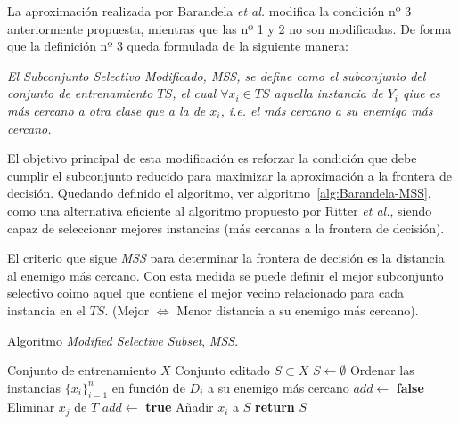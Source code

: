 La aproximación realizada por Barandela \textit{et al.} modifica la condición nº 3 anteriormente propuesta, mientras que las nº 1 y 2 no son modificadas. De forma que la definición nº 3 queda formulada de la siguiente manera:

\emph{El Subconjunto Selectivo Modificado, \textit{MSS}, se define como el subconjunto del conjunto de entrenamiento $TS$, el cual $\forall x_i \in TS$ aquella instancia de $Y_i$ qiue es más cercano a otra clase que a la de $x_i$, i.e. el más cercano a su enemigo más cercano.}


El objetivo principal de esta modificación es reforzar la condición que debe cumplir el subconjunto reducido para maximizar la aproximación a la frontera de decisión. Quedando definido el algoritmo, ver algoritmo~\ref{alg:Barandela-MSS}, como una alternativa eficiente al algoritmo propuesto por Ritter \textit{et al.}, siendo capaz de seleccionar mejores instancias (más cercanas a la frontera de decisión). 

El criterio que sigue \textit{MSS} para determinar la frontera de decisión es la distancia al enemigo más cercano. Con esta medida se puede definir el mejor subconjunto selectivo coimo aquel que contiene el mejor vecino relacionado para cada instancia en el $TS$. (Mejor $\iff$ Menor distancia a su enemigo más cercano).

\begin{algorithm}[H]
\caption{Algoritmo \textit{Modified Selective Subset}, \textit{MSS}.}\label{alg:Barandela-MSS}
\begin{algorithmic}[1]
\Require Conjunto de entrenamiento $X$
\Ensure Conjunto editado $S \subset X$
\Statex
{}	
	\State $S \leftarrow \emptyset$
	\State Ordenar las instancias $\lbrace x_i \rbrace^{n}_{i=1}$ en función de $D_i$ a su enemigo más cercano
		\State $add \leftarrow$ \textbf{false}
				 \State Eliminar $x_j$ de $T$
				 \State $add \leftarrow$ \textbf{true}
			\EndIf
		\EndFor
			\State Añadir $x_i$ a $S$
		\EndIf 
			\State \textbf{return} $S$
		\EndIf
	\EndFor
\EndProcedure
\end{algorithmic}
\end{algorithm}

